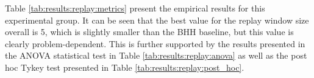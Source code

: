 Table \ref{tab:results:replay:metrics} present the empirical results for this experimental group. It can be seen that the best value for the replay window size overall is 5, which is slightly smaller than the \Ac{BHH} baseline, but this value is clearly problem-dependent. This is further supported by the results presented in the ANOVA statistical test in Table \ref{tab:results:replay:anova} as well as the post hoc Tykey test presented in Table \ref{tab:results:replay:post_hoc}.

\begin{table}[htbp]
	\centering
	\caption{Empirical results showcasing rank statistics for different replay window sizes used by the \acs{BHH} across multiple datasets}
	\label{tab:results:replay:metrics}%
	\par\bigskip
\end{table}
